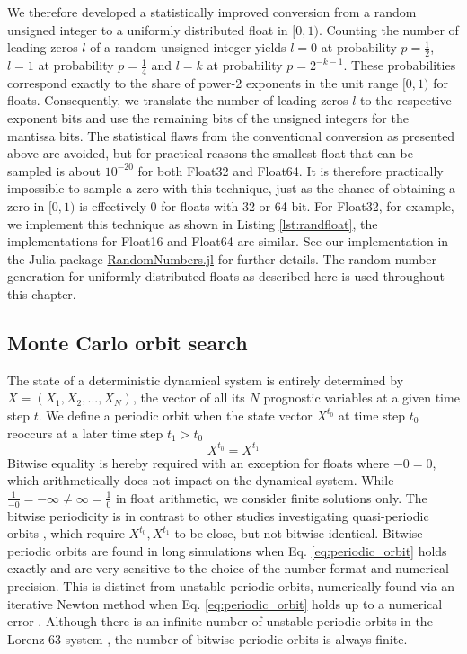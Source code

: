 We therefore developed a statistically improved conversion from a random unsigned integer to a uniformly distributed
float in $[0,1)$. Counting the number of leading zeros $l$ of a random unsigned integer yields $l = 0$ at probability
$p = \tfrac{1}{2}$, $l=1$ at probability $p=\tfrac{1}{4}$ and $l = k$ at probability $p=2^{-k-1}$. These probabilities
correspond exactly to the share of power-2 exponents in the unit range $[0,1)$ for floats.
Consequently, we translate the number of leading zeros $l$  to the respective exponent bits and use the remaining
bits of the unsigned integers for the mantissa bits. The statistical flaws from the conventional conversion as presented
above are avoided, but for practical reasons the smallest float that can be sampled is about $10^{-20}$ for both Float32
and Float64. It is therefore practically impossible to sample a zero with this technique, just as the chance of obtaining a
zero in $[0,1)$ is effectively 0 for floats with 32 or 64 bit. For Float32, for example, we implement this technique as shown
in Listing \ref{lst:randfloat}, the implementations for Float16 and Float64 are similar. See our implementation in the Julia-package
\href{https://github.com/JuliaRandom/RandomNumbers.jl}{RandomNumbers.jl} for further details. The random number generation
for uniformly distributed floats as described here is used throughout this chapter.

\subsection{Monte Carlo orbit search}
\label{sec:orbit_search}

The state of a deterministic dynamical system is entirely determined by $X = (X_1,X_2,...,X_N)$, the vector of all its $N$
prognostic variables at a given time step $t$. We define a periodic orbit when the state vector $X^{t_0}$ at time step $t_0$
reoccurs at a later time step $t_1 > t_0$
\begin{equation}
	X^{t_0} = X^{t_1}
	\label{eq:periodic_orbit}
\end{equation}
Bitwise equality is hereby required with an exception for floats where $-0 = 0$, which arithmetically does not impact on the
dynamical system. While $\tfrac{1}{-0} = -\infty \neq \infty = \tfrac{1}{0}$ in float arithmetic, we consider finite solutions only.
The bitwise periodicity is in contrast to other studies investigating quasi-periodic orbits \citep{Urminsky2010,Yalniz2021},
which require $X^{t_0}, X^{t_1}$ to be close, but not bitwise identical. Bitwise periodic orbits are found in long simulations
when Eq. \ref{eq:periodic_orbit} holds exactly and are very sensitive to the choice of the number format and numerical
precision. This is distinct from unstable periodic orbits, numerically found via an iterative Newton method when
Eq. \ref{eq:periodic_orbit} holds up to a numerical error \citep{Viswanath2007}. Although there is an infinite number of unstable
periodic orbits in the Lorenz 63 system \citep{Capinski2018,Lorenz1963}, the number of bitwise periodic orbits is always finite.

